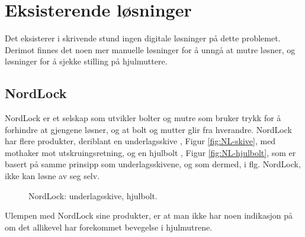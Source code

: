 \section{Eksisterende løsninger}
\label{sec:existing-solutions}
Det eksisterer i skrivende stund ingen digitale løsninger på dette problemet. 
Derimot finnes det noen mer manuelle løsninger for å unngå at mutre løsner, 
og løsninger for å sjekke stilling på hjulmuttere.
\subsection{NordLock}
NordLock er et selskap som utvikler bolter og mutre som bruker trykk for å forhindre 
at gjengene løsner, og at bolt og mutter glir fra hverandre. NordLock har flere 
produkter, deriblant en underlagsskive \cite{NL-skive}, Figur \ref{fig:NL-skive}, med mothaker mot 
utskruingsretning, og en hjulbolt \cite{NL-hjulbolt}, Figur 
\ref{fig:NL-hjulbolt}, som er basert på samme prinsipp som 
underlagsskivene, og som dermed, i flg. NordLock, ikke kan løsne av seg selv.
\newline
\begin{figure}[H]
%
\hfill
{}%
\caption{NordLock: \protect{\ref{fig:NL-skive}} underlagsskive, \protect{\ref{fig:NL-hjulbolt}} hjulbolt.}
\end{figure}

Ulempen med NordLock sine produkter, er at man ikke har noen indikasjon på om 
det allikevel har forekommet bevegelse i hjulmutrene. 


